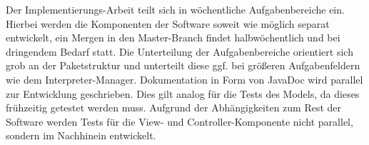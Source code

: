 \documentclass[parskip=full,11pt,twoside]{scrartcl}
\begin{document}
\begin{ganttchart}[x unit = 1.4cm, y unit chart = 0.95cm]{0}{4}
	
	

\end{ganttchart}
\newpage
Der Implementierungs-Arbeit teilt sich in wöchentliche Aufgabenbereiche ein. Hierbei werden die Komponenten der Software soweit wie möglich separat entwickelt, ein Mergen in den Master-Branch findet halbwöchentlich und bei dringendem Bedarf statt. Die Unterteilung der Aufgabenbereiche orientiert sich grob an der Paketstruktur und unterteilt diese ggf. bei größeren Aufgabenfeldern wie dem Interpreter-Manager. Dokumentation in Form von JavaDoc wird parallel zur Entwicklung geschrieben. Dies gilt analog für die Tests des Models, da dieses frühzeitig getestet werden muss. Aufgrund der Abhängigkeiten zum Rest der Software werden Tests für die View- und Controller-Komponente nicht parallel, sondern im Nachhinein entwickelt.
\end{document}
